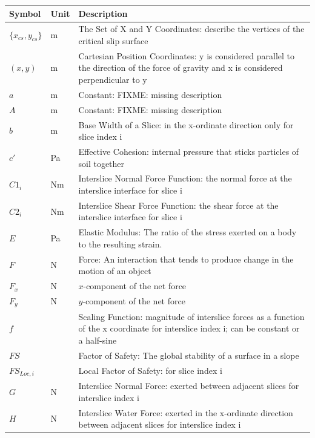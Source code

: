 \documentclass[12pt]{article}
\renewcommand{\arraystretch}{1}
\begin{document}
\renewcommand{\arraystretch}{1.6}
\setlength{\tabcolsep}{20pt}
\begin{longtable}{  l  l  p{8.5cm}  }
\hline
\textbf{Symbol} & \textbf{Unit} & \textbf{Description} \\
\hline
$\{{x_{cs}}{,y_{cs}}\}$ & \si{\meter}& The Set of X and Y Coordinates: describe the vertices of the critical slip surface 
\\
$(x,y)$ & \si{\meter}& Cartesian Position Coordinates: y is considered parallel to the direction of the force of gravity and x is considered perpendicular to y
\\
$a$ & \si{\meter}& Constant: FIXME: missing description
\\
$A$ & \si{\meter}& Constant: FIXME: missing description
\\
$b$ & \si{\meter}& Base Width of a Slice: in the x-ordinate direction only for slice index i
\\
$c'$ & \si{\pascal} & Effective Cohesion: internal pressure that sticks particles of soil together 
\\
${C1_{i}}$ &  N\si{\meter}&Interslice Normal Force Function: the normal force at the interslice interface for slice i
\\
${C2_{i}}$ &  N\si{\meter}&Interslice Shear Force Function: the shear force at the interslice interface for slice i
\\
$E$ & \si{\pascal} & Elastic Modulus: The ratio of the stress exerted on a body to the resulting strain.
\\
$F$ &\si{\newton} & Force: An interaction that tends to produce change in the motion of an object 
\\
${F_{x}}$ & \si{\newton} &$x$-component of the net force
\\
${F_{y}}$ & \si{\newton} &$y$-component of the net force
\\
$f$ & & Scaling Function: magnitude of interslice forces as a function of the x coordinate for interslice index i; can be constant or a half-sine
\\
$FS$ & &Factor of Safety: The global stability of a surface in a slope  
\\
${FS_{Loc,i}}$ & & Local Factor of Safety: for slice index i  
\\
$G$ & \si{\newton} & Interslice Normal Force: exerted between adjacent slices for interslice index i
\\
$H$ & \si{\newton} &Interslice Water Force: exerted in the x-ordinate direction between adjacent slices for interslice index i
\\

\end{longtable}
\end{document}
